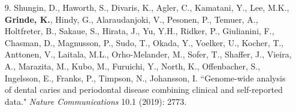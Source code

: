 \documentclass[margin]{res}
\begin{document}
\begin{resume}
\begin{itemize}
\item[9.] Shungin, D., Haworth, S., Divaris, K., Agler, C., Kamatani, Y., Lee, M.K., \textbf{Grinde, K.}, Hindy, G., Alaraudanjoki, V., Pesonen, P., Temuer, A., Holtfreter, B., Sakaue, S., Hirata, J., Yu, Y.H., Ridker, P., Giulianini, F., Chasman, D., Magnusson, P., Sudo, T., Okada, Y., Voelker, U., Kocher, T., Anttonen, V., Laitala, M.L., Orho-Melander, M., Sofer, T., Shaffer, J., Vieira, A., Marazita, M., Kubo, M., Furuichi, Y., North, K., Offenbacher, S., Ingelsson, E., Franks, P., Timpson, N., Johansson, I. ``Genome-wide analysis of dental caries and periodontal disease combining clinical and self-reported data." \textit{Nature Communications} 10.1 (2019): 2773.


\end{itemize}
\end{resume}
\end{document}
